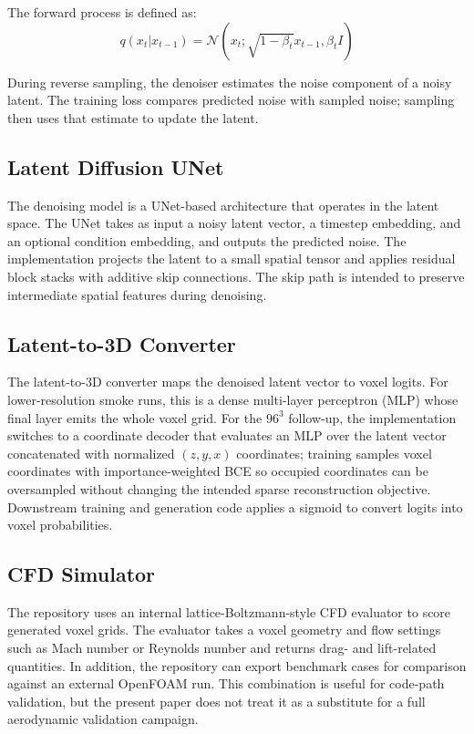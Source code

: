 The forward process is defined as:
\begin{equation}
q(x_t | x_{t-1}) = \mathcal{N}(x_t; \sqrt{1 - \beta_t} x_{t-1}, \beta_t I)
\end{equation}

During reverse sampling, the denoiser estimates the noise component of a noisy latent. The training loss compares predicted noise with sampled noise; sampling then uses that estimate to update the latent.

\subsection{Latent Diffusion UNet}
The denoising model is a UNet-based architecture that operates in the latent space. The UNet takes as input a noisy latent vector, a timestep embedding, and an optional condition embedding, and outputs the predicted noise. The implementation projects the latent to a small spatial tensor and applies residual block stacks with additive skip connections. The skip path is intended to preserve intermediate spatial features during denoising.

\subsection{Latent-to-3D Converter}
The latent-to-3D converter maps the denoised latent vector to voxel logits. For lower-resolution smoke runs, this is a dense multi-layer perceptron (MLP) whose final layer emits the whole voxel grid. For the \(96^3\) follow-up, the implementation switches to a coordinate decoder that evaluates an MLP over the latent vector concatenated with normalized \((z,y,x)\) coordinates; training samples voxel coordinates with importance-weighted BCE so occupied coordinates can be oversampled without changing the intended sparse reconstruction objective. Downstream training and generation code applies a sigmoid to convert logits into voxel probabilities.

\subsection{CFD Simulator}
The repository uses an internal lattice-Boltzmann-style CFD evaluator to score generated voxel grids. The evaluator takes a voxel geometry and flow settings such as Mach number or Reynolds number and returns drag- and lift-related quantities. In addition, the repository can export benchmark cases for comparison against an external OpenFOAM run. This combination is useful for code-path validation, but the present paper does not treat it as a substitute for a full aerodynamic validation campaign.

